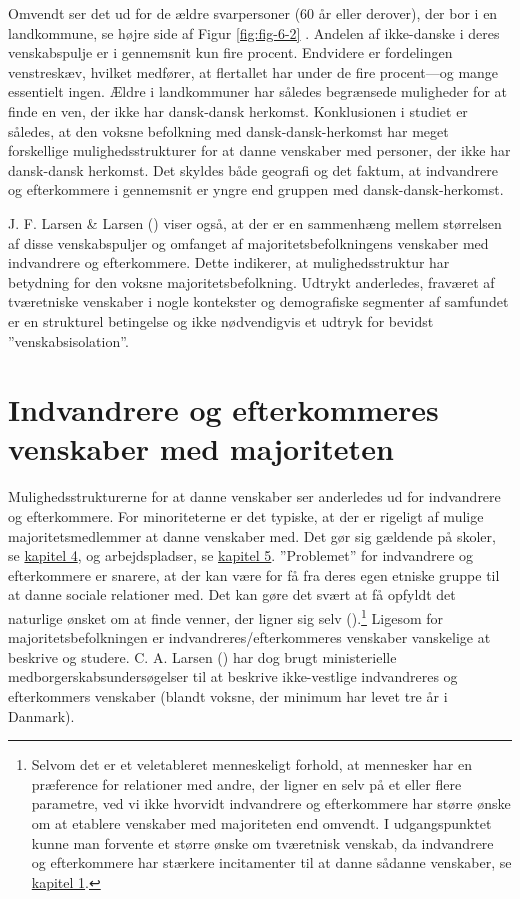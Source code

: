 \documentclass[
]{book}
\begin{document}
Omvendt ser det ud for de ældre svarpersoner (60 år eller derover), der bor i en landkommune, se højre side af Figur \ref{fig:fig-6-2} . Andelen af ikke-danske i deres venskabspulje er i gennemsnit kun fire procent. Endvidere er fordelingen venstreskæv, hvilket medfører, at flertallet har under de fire procent---og mange essentielt ingen. Ældre i landkommuner har således begrænsede muligheder for at finde en ven, der ikke har dansk-dansk herkomst. Konklusionen i studiet er således, at den voksne befolkning med dansk-dansk-herkomst har meget forskellige mulighedsstrukturer for at danne venskaber med personer, der ikke har dansk-dansk herkomst. Det skyldes både geografi og det faktum, at indvandrere og efterkommere i gennemsnit er yngre end gruppen med dansk-dansk-herkomst.

J. F. Larsen \& Larsen () viser også, at der er en sammenhæng mellem størrelsen af disse venskabspuljer og omfanget af majoritetsbefolkningens venskaber med indvandrere og efterkommere. Dette indikerer, at mulighedsstruktur har betydning for den voksne majoritetsbefolkning. Udtrykt anderledes, fraværet af tværetniske venskaber i nogle kontekster og demografiske segmenter af samfundet er en strukturel betingelse og ikke nødvendigvis et udtryk for bevidst ''venskabsisolation''.

\section{Indvandrere og efterkommeres venskaber med majoriteten}\label{indvandrere-og-efterkommeres-venskaber-med-majoriteten}

Mulighedsstrukturerne for at danne venskaber ser anderledes ud for indvandrere og efterkommere. For minoriteterne er det typiske, at der er rigeligt af mulige majoritetsmedlemmer at danne venskaber med. Det gør sig gældende på skoler, se \hyperref[kap4]{kapitel 4}, og arbejdspladser, se \hyperref[kap5]{kapitel 5}. ''Problemet'' for indvandrere og efterkommere er snarere, at der kan være for få fra deres egen etniske gruppe til at danne sociale relationer med. Det kan gøre det svært at få opfyldt det naturlige ønsket om at finde venner, der ligner sig selv ().\footnote{Selvom det er et veletableret menneskeligt forhold, at mennesker har en præference for relationer med andre, der ligner en selv på et eller flere parametre, ved vi ikke hvorvidt indvandrere og efterkommere har større ønske om at etablere venskaber med majoriteten end omvendt. I udgangspunktet kunne man forvente et større ønske om tværetnisk venskab, da indvandrere og efterkommere har stærkere incitamenter til at danne sådanne venskaber, se \hyperref[kap1]{kapitel 1}.} Ligesom for majoritetsbefolkningen er indvandreres/efterkommeres venskaber vanskelige at beskrive og studere. C. A. Larsen () har dog brugt ministerielle medborgerskabsundersøgelser til at beskrive ikke-vestlige indvandreres og efterkommers venskaber (blandt voksne, der minimum har levet tre år i Danmark).
\end{document}
